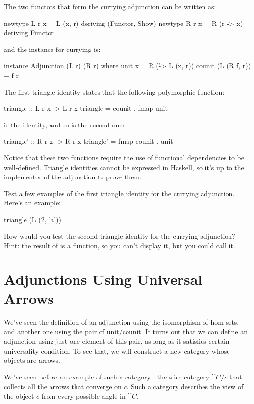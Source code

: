 \documentclass[DaoFP]{subfiles}
\begin{document}
The two functors that form the currying adjunction can be written as:
\begin{haskell}
newtype L r x = L (x, r)    deriving (Functor, Show)
newtype R r x = R (r -> x)  deriving Functor
\end{haskell}
and the  instance for currying is:
\begin{haskell}
instance Adjunction (L r) (R r) where
  unit x = R (\r -> L (x, r)) 
  counit (L (R f, r)) = f r
\end{haskell}
The first triangle identity states that the following polymorphic function:
\begin{haskell}
triangle :: L r x -> L r x
triangle = counit . fmap unit
\end{haskell}
is the identity, and so is the second one: 
\begin{haskell}
triangle' :: R r x -> R r x
triangle' = fmap counit . unit
\end{haskell}
Notice that these two functions require the use of functional dependencies to be well-defined. Triangle identities cannot be expressed in Haskell, so it's up to the implementor of the adjunction to prove them.
\begin{exercise}
Test a few examples of the first triangle identity for the currying adjunction. Here's an example:
\begin{haskell}
triangle (L (2, 'a'))
\end{haskell}
\end{exercise}

\begin{exercise}
How would you test the second triangle identity for the currying adjunction? Hint: the result of  is a function, so you can't display it, but you could call it.
\end{exercise}

\section{Adjunctions Using Universal Arrows}

We've seen the definition of an adjunction using the isomorphism of hom-sets, and another one using the pair of unit/counit. It turns out that we can define an adjunction using just one element of this pair, as long as it satisfies certain universality condition. To see that, we will construct a new category whose objects are arrows. 

We've seen before an example of such a category---the slice category $\cat C/ c$ that collects all the arrows that converge on $c$. Such a category describes the view of the object $c$ from every possible angle in $\cat C$. 
\end{document}
